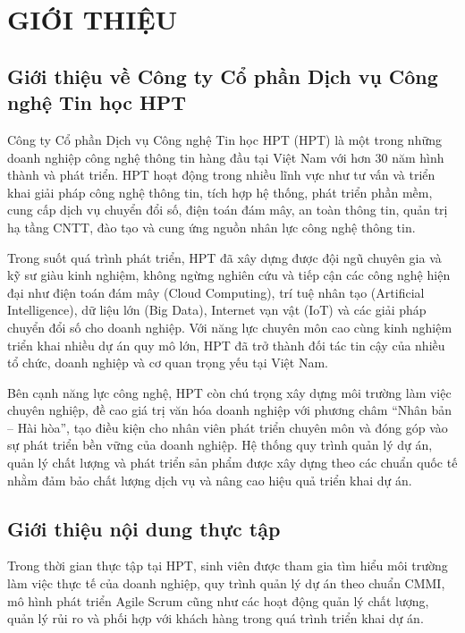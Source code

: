 \section{GIỚI THIỆU}

\subsection{Giới thiệu về Công ty Cổ phần Dịch vụ Công nghệ Tin học HPT}

Công ty Cổ phần Dịch vụ Công nghệ Tin học HPT (HPT) là một trong những doanh nghiệp công nghệ thông tin hàng đầu tại Việt Nam với hơn 30 năm hình thành và phát triển. HPT hoạt động trong nhiều lĩnh vực như tư vấn và triển khai giải pháp công nghệ thông tin, tích hợp hệ thống, phát triển phần mềm, cung cấp dịch vụ chuyển đổi số, điện toán đám mây, an toàn thông tin, quản trị hạ tầng CNTT, đào tạo và cung ứng nguồn nhân lực công nghệ thông tin.

Trong suốt quá trình phát triển, HPT đã xây dựng được đội ngũ chuyên gia và kỹ sư giàu kinh nghiệm, không ngừng nghiên cứu và tiếp cận các công nghệ hiện đại như điện toán đám mây (Cloud Computing), trí tuệ nhân tạo (Artificial Intelligence), dữ liệu lớn (Big Data), Internet vạn vật (IoT) và các giải pháp chuyển đổi số cho doanh nghiệp. Với năng lực chuyên môn cao cùng kinh nghiệm triển khai nhiều dự án quy mô lớn, HPT đã trở thành đối tác tin cậy của nhiều tổ chức, doanh nghiệp và cơ quan trọng yếu tại Việt Nam.

Bên cạnh năng lực công nghệ, HPT còn chú trọng xây dựng môi trường làm việc chuyên nghiệp, đề cao giá trị văn hóa doanh nghiệp với phương châm ``Nhân bản -- Hài hòa'', tạo điều kiện cho nhân viên phát triển chuyên môn và đóng góp vào sự phát triển bền vững của doanh nghiệp. Hệ thống quy trình quản lý dự án, quản lý chất lượng và phát triển sản phẩm được xây dựng theo các chuẩn quốc tế nhằm đảm bảo chất lượng dịch vụ và nâng cao hiệu quả triển khai dự án.

\subsection{Giới thiệu nội dung thực tập}

Trong thời gian thực tập tại HPT, sinh viên được tham gia tìm hiểu môi trường làm việc thực tế của doanh nghiệp, quy trình quản lý dự án theo chuẩn CMMI, mô hình phát triển Agile Scrum cũng như các hoạt động quản lý chất lượng, quản lý rủi ro và phối hợp với khách hàng trong quá trình triển khai dự án.

